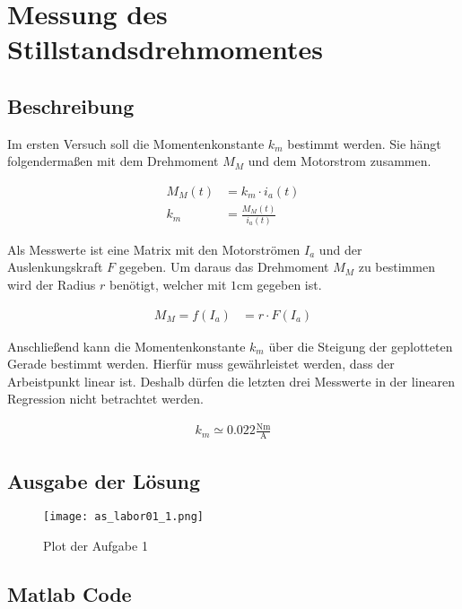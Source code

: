 \section{Messung des Stillstandsdrehmomentes}

\subsection{Beschreibung}

Im ersten Versuch soll die Momentenkonstante $k_m$ bestimmt werden.
Sie hängt folgendermaßen mit dem Drehmoment $M_M$ und dem Motorstrom
zusammen. 

\begin{equation} \label{eq1}
    \begin{split}
        M_M(t)&=k_m \cdot i_a(t)\\
        k_m&=\frac{M_M(t)}{i_a(t)}
    \end{split}
\end{equation}

Als Messwerte ist eine Matrix mit den Motorströmen $I_a$ und der Auslenkungskraft
$F$ gegeben. Um daraus das Drehmoment $M_M$ zu bestimmen wird der Radius $r$
benötigt, welcher mit $1 \mathrm{cm}$ gegeben ist.

\begin{equation} \label{eq2}
    \begin{split}
        M_M=f(I_a)&=r \cdot F(I_a)
    \end{split}
\end{equation}

Anschließend kann die Momentenkonstante $k_m$ über die Steigung der geplotteten
Gerade bestimmt werden. Hierfür muss gewährleistet werden, dass der Arbeistpunkt
linear ist. Deshalb dürfen die letzten drei Messwerte in der linearen Regression
nicht betrachtet werden.

\begin{equation} \label{eq3}
    \begin{split}
        k_m\simeq 0.022 \mathrm{\frac{Nm}{A}}
    \end{split}
\end{equation}






\subsection{Ausgabe der Lösung}
\begin{figure}[H]
 \centering
 \texttt{[image: as\_labor01\_1.png]}
 \caption{Plot der Aufgabe 1}
 \label{fig:PlotAufgabe1}
\end{figure}

\subsection{Matlab Code}

